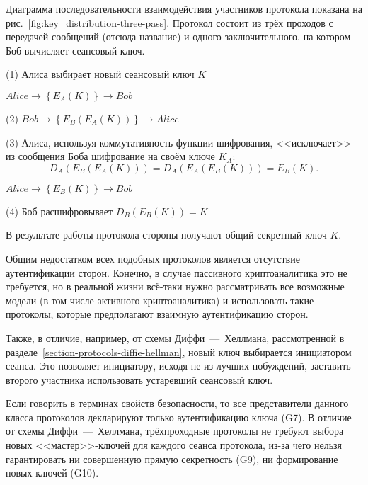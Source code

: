 Диаграмма последовательности взаимодействия участников протокола показана на рис.~\ref{fig:key_distribution-three-pass}. Протокол состоит из трёх проходов с передачей сообщений (отсюда название) и одного заключительного, на котором Боб вычисляет сеансовый ключ.

\begin{protocol}
    \item[(1)] Алиса выбирает новый сеансовый ключ $K$
    \item[{}] $Alice \to \left\{ E_A \left( K \right) \right\} \to Bob$
    \item[(2)] $Bob \to \left\{ E_B \left( E_A \left( K \right) \right) \right\} \to Alice$
    \item[(3)] Алиса, используя коммутативность функции шифрования, <<исключает>> из сообщения Боба шифрование на своём ключе $K_A$:
	\[ D_A \left( E_B \left( E_A \left( K \right) \right) \right) = D_A \left( E_A \left( E_B \left( K \right) \right) \right) = E_B \left( K \right). \]
    \item[{}] $Alice \to \left\{ E_B \left( K \right) \right\} \to Bob$
    \item[(4)] Боб расшифровывает $D_B \left( E_B \left( K \right) \right) = K$
\end{protocol}

В результате работы протокола стороны получают общий секретный ключ $K$.

Общим недостатком всех подобных протоколов является отсутствие аутентификации сторон. Конечно, в случае пассивного криптоаналитика это не требуется, но в реальной жизни всё-таки нужно рассматривать все возможные модели (в том числе активного криптоаналитика) и использовать такие протоколы, которые предполагают взаимную аутентификацию сторон.

Также, в отличие, например, от схемы Диффи~---~Хеллмана, рассмотренной в разделе~\ref{section-protocols-diffie-hellman}, новый ключ выбирается инициатором сеанса. Это позволяет инициатору, исходя не из лучших побуждений, заставить второго участника использовать устаревший сеансовый ключ.

Если говорить в терминах свойств безопасности, то все представители данного класса протоколов декларируют только аутентификацию ключа (G7). В отличие от схемы Диффи~---~Хеллмана, трёхпроходные протоколы не требуют выбора новых <<мастер>>-ключей для каждого сеанса протокола, из-за чего нельзя гарантировать ни совершенную прямую секретность (G9), ни формирование новых ключей (G10).

